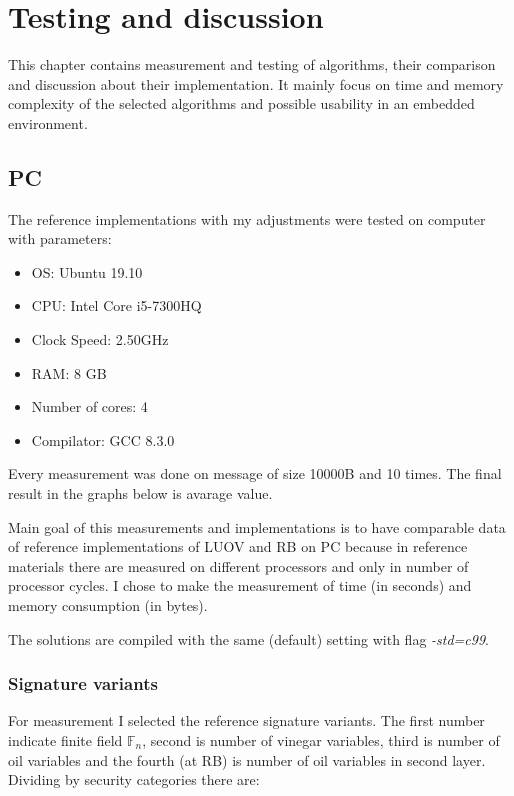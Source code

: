 \documentclass[thesis=M,english]{FITthesis}[2019/12/23]
\begin{document}
\chapter{Testing and discussion} \label{test-and-disk}
This chapter contains measurement and testing of algorithms, their comparison and discussion about their implementation. It mainly focus on time and memory complexity of the selected algorithms and possible usability in an embedded environment.

\section{PC}
The reference implementations with my adjustments were tested on computer with parameters:
\begin{itemize}
\item OS: Ubuntu 19.10
\item CPU: Intel Core i5-7300HQ
\item Clock Speed: 2.50GHz
\item RAM: 8 GB
\item Number of cores: 4
\item Compilator: GCC 8.3.0
\end{itemize}

\bigskip
\noindent
Every measurement was done on message of size 10000B and 10 times. The final result in the graphs below is avarage value.

\bigskip
\noindent
Main goal of this measurements and implementations is to have comparable data of reference implementations of LUOV and RB on PC because in reference materials there are measured on different processors and only in number of processor cycles. I chose to make the measurement of time (in seconds) and memory consumption (in bytes).

\bigskip
\noindent
The solutions are compiled with the same (default) setting with flag \textit{-std=c99}.

\subsection{Signature variants}
For measurement I selected the reference signature variants. The first number indicate finite field $\mathbb{F}_{n}$, second is number of vinegar variables, third is number of oil variables and the fourth (at RB) is number of oil variables in second layer. Dividing by security categories there are:
\end{document}
